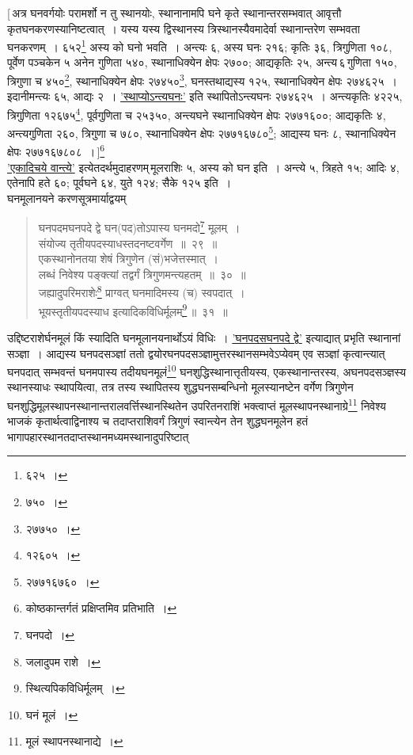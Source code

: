 \documentclass[10pt, openany]{book}
\begin{document}
{[\,अत्र घनवर्गयोः परामर्शो न तु स्थानयोः, स्थानानामपि घने कृते
स्थानान्तरसम्भवात्}
{आवृत्तौ कृतघनकरणस्यानिष्टत्वात्~। यस्य यस्य द्विस्थानस्य
त्रिस्थानस्यैवमादेर्वा स्थानान्तरेण}
{सम्भवता घनकरणम्~। ६५२\renewcommand{\thefootnote}{\s १}\footnote{\s ६२५~।} अस्य को घनो भवति~। अन्त्यः ६, अस्य घनः २१६;
कृतिः ३६,}
{त्रिगुणिता १०८, पूर्वेण पञ्चकेन ५ अनेन गुणिता ५४०, स्थानाधिक्येन
क्षेपः २७००;}
{आद्यकृतिः २५, अन्त्य\textendash \,६\textendash \,गुणिता १५०, त्रिगुणा च ४५०\renewcommand{\thefootnote}{	\s २}\footnote{\s ७५०~।}, स्थानाधिक्येन
क्षेपः २७४५०\renewcommand{\thefootnote}{\s ३}\footnote{\s २७७५०~।},}
{घनस्तथाद्यस्य १२५, स्थानाधिक्येन क्षेपः २७४६२५~। इदानीमन्त्यः ६५, आद्यः २~। \hyperref[27]{'स्थाप्योऽन्त्यघनः'} इति स्थापितोऽन्त्यघनः २७४६२५~। अन्त्यकृतिः
४२२५, त्रिगुणिता}
{१२६७५\renewcommand{\thefootnote}{\s ४}\footnote{\s १२६०५~।}, पूर्वगुणिता च २५३५०, अन्त्यघने स्थानाधिक्येन क्षेपः
२७७१६००; आद्यकृतिः}
{४, अन्त्यगुणिता २६०, त्रिगुणा च ७८०, स्थानाधिक्येन क्षेपः
२७७१६७८०\renewcommand{\thefootnote}{\s ५}\footnote{\s २७७१६७६०~।}; आद्यस्य}
{घनः ८, स्थानाधिक्येन क्षेपः २७७१६७८०८~।\,]\renewcommand{\thefootnote}{\s ६}\footnote{\s कोष्ठकान्तर्गतं प्रक्षिप्तमिव प्रतिभाति~।}}\\

{\hyperref[27]{'एकादिचये वान्त्ये'} इत्येतदर्थमुदाहरणम्\textendash \,मूलराशिः ५, अस्य को घन
इति~।}
{अन्त्ये ५, त्रिहते १५; आदिः ४, एतेनापि हते ६०; पूर्वघने ६४, युते १२४;
सैके १२५ इति~।}\\
    
{घनमूलानयने करणसूत्रमार्याद्वयम्\textemdash}

 \label{29}
\begin{quote}
{\bs घनपदमघनपदे द्वे घन(पद)तोऽपास्य घनमदो\renewcommand{\thefootnote}{\s ७}\footnote{\s घनपदो~।} मूलम्~। \\
 संयोज्य तृतीयपदस्याधस्तदनष्टवर्गेण~॥~२९~॥ \\
 एकस्थानोनतया शेषं त्रिगुणेन (सं)भजेत्तस्मात्~। \\
 लब्धं निवेश्य पङ्क्त्यां तद्वर्गं त्रिगुणमन्त्यहतम्~॥~३०~॥ \\
 जह्यादुपरिमराशेः\renewcommand{\thefootnote}{\s ८}\footnote{\s जलादुपम राशे~।} प्राग्वत् घनमादिमस्य (च) स्वपदात्~। \\
 भूयस्तृतीयपदस्याध इत्यादिकविधिर्मूलम्\renewcommand{\thefootnote}{\s ९}\footnote{\s *स्थित्यपिकविधिर्मूलम्~।}\,॥~३१~॥}\end{quote}

{उद्दिष्टराशेर्घनमूलं किं स्यादिति घनमूलानयनार्थोऽयं विधिः~। \hyperref[29]{'घनपदसघनपदे द्वे'}}
{इत्याद्यात् प्रभृति स्थानानां सञ्ज्ञा~। आद्यस्य घनपदसञ्ज्ञां ततो
द्वयोरघनपदसञ्ज्ञामुत्तरस्थानसम्भवेऽप्येवम् एव} 
{सञ्ज्ञां कृत्वान्त्यात् घनपदात् सम्भवन्तं घनमपास्य
तदीयघनमूलं\renewcommand{\thefootnote}{\s १०}\footnote{\s *घनं मूलं~।} घनशुद्धिस्थानात्तृतीयस्य, एकस्थानान्तरस्य, अघनपदसञ्ज्ञस्य स्थानस्याधः स्थापयित्वा, तत्र तस्य}
{स्थापितस्य शुद्धघनसम्बन्धिनो मूलस्यानष्टेन वर्गेण त्रिगुणेन}
{घनशुद्धिमूलस्थापनस्थानान्तरालवर्त्तिस्थानस्थितेन}
{उपरितनराशिं  भक्त्वाप्तं  मूलस्थापनस्थानाग्रे\renewcommand{\thefootnote}{\s ११}\footnote{\s मूलं स्थापनस्थानाद्ये~।}
निवेश्य भाजकं कृतार्थत्वाद्विनाश्य 
च तदाप्तराशिवर्गं त्रिगुणं स्वान्त्येन तेन शुद्धघनमूलेन
हतं भागापहारस्थानतदाप्तस्थानमध्यमस्थानादुपरिष्टात्}
\end{document}
